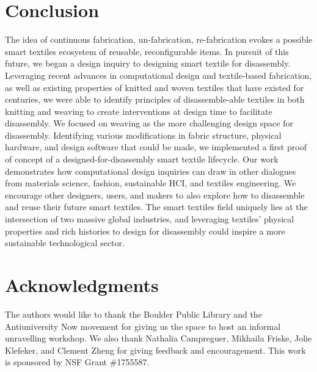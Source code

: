 \documentclass{sigchi}
\begin{document}
\section{Conclusion}

The idea of continuous fabrication, un-fabrication, re-fabrication evokes a possible smart textiles ecosystem of reusable, reconfigurable items. In pursuit of this future, we began a design inquiry to designing smart textile for disassembly. Leveraging recent advances in computational design and textile-based fabrication, as well as existing properties of knitted and woven textiles that have existed for centuries, we were able to identify principles of disassemble-able textiles in both knitting and weaving to create interventions at design time to facilitate disassembly. We focused on weaving as the more challenging design space for disassembly. Identifying various modifications in fabric structure, physical hardware, and design software that could be made, we implemented a first proof of concept of a designed-for-disassembly smart textile lifecycle. Our work demonstrates how computational design inquiries can draw in other dialogues from materials science, fashion, sustainable HCI, and textiles engineering. We encourage other designers, users, and makers to also explore how to disassemble and reuse their future smart textiles. The smart textiles field uniquely lies at the intersection of two massive global industries, and leveraging textiles' physical properties and rich histories to design for disassembly could inspire a more sustainable technological sector. 


\section{Acknowledgments}
The authors would like to thank the Boulder Public Library and the Antiuniversity Now movement for giving us the space to host an informal unravelling workshop. We also thank Nathalia Campreguer, Mikhaila Friske, Jolie Klefeker, and Clement Zheng for giving feedback and encouragement. This work is sponsored by NSF Grant \#1755587.

\balance{}

\end{document}
